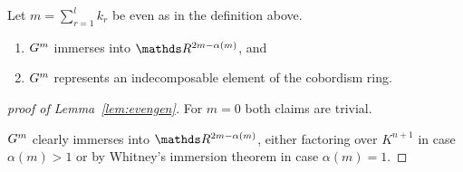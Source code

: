 \begin{Lem}\label{lem:evengen}
  Let $m=\sum_{r=1}^l k_r$ be even as in the definition above.
  \begin{enumerate}
  \item\label{lem:evengen:immersionprop}
    $G^{m}$ immerses into $\R^{2m-\alpha(m)}$, and
  \item\label{lem:evengen:indecomposable}
    $G^{m}$ represents an indecomposable element of the
    cobordism ring.
  \end{enumerate}
\end{Lem}
\begin{proof}[proof of
  Lemma~\ref{lem:evengen}]
  For $m=0$ both claims are trivial.
  
  $G^{m}$ clearly immerses into $\R^{2m-\alpha(m)}$, either factoring
  over $K^{n+1}$ in case $\alpha(m)>1$ or by Whitney's immersion
  theorem in case $\alpha(m)=1$.


\end{proof}
